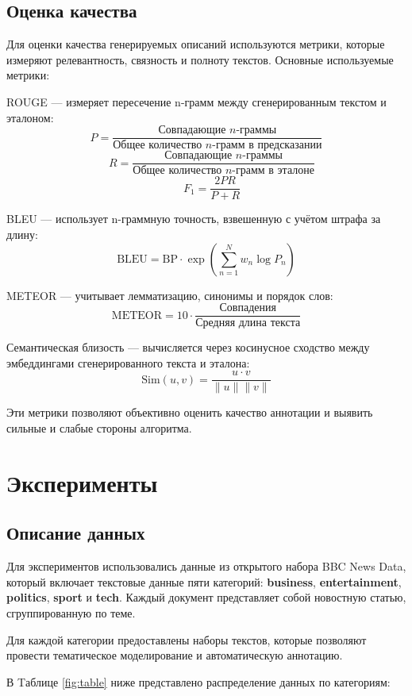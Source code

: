 \documentclass{article}
\begin{document}
\subsection{Оценка качества}

Для оценки качества генерируемых описаний используются метрики, которые измеряют релевантность, связность и полноту текстов. Основные используемые метрики:

ROUGE — измеряет пересечение n-грамм между сгенерированным текстом и эталоном:
  $$
  P = \frac{\text{Совпадающие } n\text{-граммы}}{\text{Общее количество } n\text{-грамм в предсказании}}
  $$
  $$
  \quad R = \frac{\text{Совпадающие } n\text{-граммы}}{\text{Общее количество } n\text{-грамм в эталоне}}
  $$
  $$
  \quad F_1 = \frac{2PR}{P + R}
  $$

BLEU — использует n-граммную точность, взвешенную с учётом штрафа за длину:
  $$
  \text{BLEU} = \text{BP} \cdot \exp \left( \sum_{n=1}^N w_n \log P_n \right)
  $$

METEOR — учитывает лемматизацию, синонимы и порядок слов:
  $$
  \text{METEOR} = 10 \cdot \frac{\text{Совпадения}}{\text{Средняя длина текста}}
  $$

Семантическая близость — вычисляется через косинусное сходство между эмбеддингами сгенерированного текста и эталона:
  $$
  \text{Sim}(u, v) = \frac{u \cdot v}{\|u\| \|v\|}
  $$

Эти метрики позволяют объективно оценить качество аннотации и выявить сильные и слабые стороны алгоритма.

\section{Эксперименты}

\subsection{Описание данных}

Для экспериментов использовались данные из открытого набора BBC News Data, который включает текстовые данные пяти категорий: \textbf{business}, \textbf{entertainment}, \textbf{politics}, \textbf{sport} и \textbf{tech}. Каждый документ представляет собой новостную статью, сгруппированную по теме.

Для каждой категории предоставлены наборы текстов, которые позволяют провести тематическое моделирование и автоматическую аннотацию.

В Tаблице \ref{fig:table} ниже представлено распределение данных по категориям:
\end{document}
